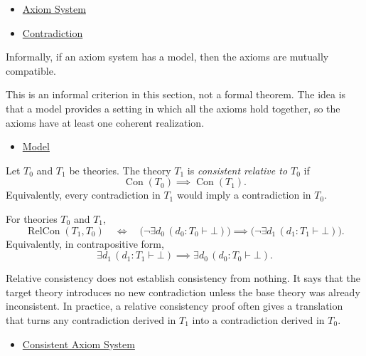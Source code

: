 \begin{dependencies}
\begin{itemize}
  \item \hyperref[def:axiom-system]{Axiom System}
  \item \hyperref[def:axiom-systems-contradiction]{Contradiction}
\end{itemize}
\end{dependencies}

\begin{definition}
\label{def:axiom-systems-model-existence-criterion}
Informally, if an axiom system has a model, then the axioms are mutually
compatible.
\end{definition}

\begin{remark*}[Interpretation]
This is an informal criterion in this section, not a formal theorem. The idea
is that a model provides a setting in which all the axioms hold together, so
the axioms have at least one coherent realization.
\end{remark*}

\begin{dependencies}
\begin{itemize}
  \item \hyperref[def:axiom-systems-model]{Model}
\end{itemize}
\end{dependencies}

\begin{definition}
\label{def:axiom-systems-relative-consistency}
Let $T_0$ and $T_1$ be theories. The theory $T_1$ is
\emph{consistent relative to $T_0$} if
\[
  \operatorname{Con}(T_0)\implies \operatorname{Con}(T_1).
\]
Equivalently, every contradiction in $T_1$ would imply a contradiction in
$T_0$.
\end{definition}

\begin{remark*}
For theories $T_0$ and $T_1$,
\[
  \operatorname{RelCon}(T_1,T_0)
  \quad\Longleftrightarrow\quad
  \bigl(\neg\exists d_0\,(d_0:T_0\vdash\bot)\bigr)
  \implies
  \bigl(\neg\exists d_1\,(d_1:T_1\vdash\bot)\bigr).
\]
Equivalently, in contrapositive form,
\[
  \exists d_1\,(d_1:T_1\vdash\bot)
  \implies
  \exists d_0\,(d_0:T_0\vdash\bot).
\]
\end{remark*}

\begin{remark*}[Interpretation]
Relative consistency does not establish consistency from nothing. It says that
the target theory introduces no new contradiction unless the base theory was
already inconsistent. In practice, a relative consistency proof often gives a
translation that turns any contradiction derived in $T_1$ into a contradiction
derived in $T_0$.
\end{remark*}

\begin{dependencies}
\begin{itemize}
  \item \hyperref[def:axiom-systems-consistent-axiom-system]{Consistent Axiom System}
\end{itemize}
\end{dependencies}
